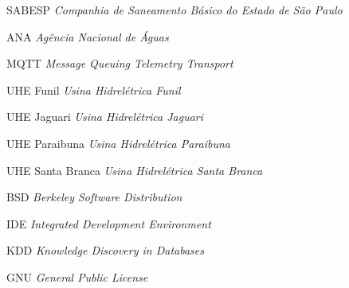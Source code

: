 \begin{siglas}
	\item[SABESP]   			\emph{Companhia de Saneamento Básico do Estado de São Paulo}
	\item[ANA]  	    		\emph{Agência Nacional de Águas}
	\item[MQTT] 				\emph{Message Queuing Telemetry Transport}
	\item[UHE Funil] 			\emph{Usina Hidrelétrica Funil}
	\item[UHE Jaguari] 			\emph{Usina Hidrelétrica Jaguari}
	\item[UHE Paraibuna] 		\emph{Usina Hidrelétrica Paraibuna}
	\item[UHE Santa Branca] \emph{Usina Hidrelétrica Santa Branca}
	\item[BSD] 					\emph{Berkeley Software Distribution}
	\item[IDE]				    \emph{Integrated Development Environment}
	\item[KDD]					\emph{Knowledge Discovery in Databases}
	\item[GNU] 					\emph{General Public License}


\end{siglas}
